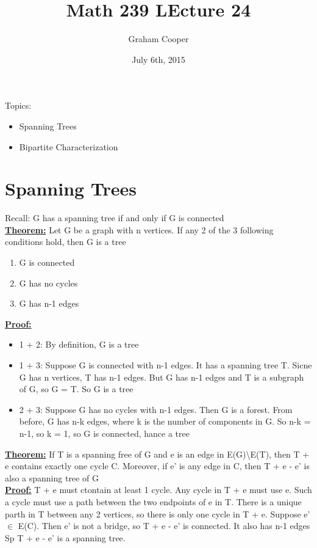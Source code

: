 \documentclass[12pt]{article}
\title{\vspace{-15ex}Math 239 LEcture 24 \vspace{-1ex}}
\date{July 6th, 2015}
\author{Graham Cooper}
\newcommand{\myt}[1]{\textbf{\underline{#1}}}
\begin{document}
	\maketitle
	
	Topics:
	\begin{itemize}
		\item Spanning Trees
		\item Bipartite Characterization
	\end{itemize}
	
	\section*{Spanning Trees}
	Recall: G has a spanning tree if and only if G is connected\\
	
	\myt{Theorem:} Let G be a graph with n vertices. If any 2 of the 3 following conditions hold, then G is a tree\\
	\begin{enumerate}
		\item G is connected
		\item G has no cycles
		\item G has n-1 edges
	\end{enumerate}
	
	\myt{Proof:} \\
	\begin{itemize}
		\item 1 + 2: By definition, G is a tree
		\item 1 + 3: Suppose G is connected with n-1 edges. It has a spanning tree T. Sicne G has n vertices, T has n-1 edges. But G has n-1 edges and T is a subgraph of G, so G = T. So G is a tree
		\item 2 + 3: Suppose G has no cycles with n-1 edges. Then G is a forest. From before, G has n-k edges, where k is the number of components in G. So n-k = n-1, so k = 1, so G is connected, hance a tree
	\end{itemize}
	
	\myt{Theorem:} If T is a spanning free of G and e is an edge in E(G)\textbackslash E(T), then T + e contains exactly one cycle C. Moreover, if e' is any edge in C, then T + e - e' is also a spanning tree of G\\
	
	\myt{Proof:} T + e must ctontain at least 1 cycle. Any cycle in T + e must use e. Such a cycle must use a path between the two endpoints of e in T. There is a unique parth in T between any 2 vertices, so there is only one cycle in T + e. Suppose e' $\in$ E(C). Then e' is not a bridge, so T + e - e' is connected. It also has n-1 edges Sp T + e - e' is a spanning tree.\\
	
\end{document}
